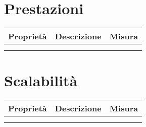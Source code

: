 \section{Prestazioni}
\begin{tabular}{|l|l|l|}
    \hline
    \multicolumn{1}{|c|}{\textbf{Proprietà}} & \textbf{Descrizione} & \textbf{Misura} \\
    \hline
     &  & \\
    \hline
     &  & \\
    \hline
\end{tabular}

\section{Scalabilità}
\begin{tabular}{|l|l|l|}
    \hline
    \multicolumn{1}{|c|}{\textbf{Proprietà}} & \textbf{Descrizione} & \textbf{Misura} \\
    \hline
     &  & \\
    \hline
     &  & \\
    \hline
\end{tabular}

